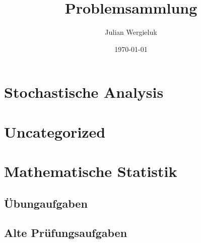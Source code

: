 \documentclass[11pt,oldfontcommands,twoside,a4paper]{memoir}
\title{Problemsammlung}\author{Julian Wergieluk}\date{\today}
\begin{document}
\frontmatter
\maketitle
\newpage
\tableofcontents

\mainmatter

\setcounter{secnumdepth}{4}
\renewcommand{\theenumi}{\Alph{enumi}.}
\renewcommand{\labelenumi}{\theenumi}





\chapter{Stochastische Analysis}






\chapter{Uncategorized}







\chapter{Mathematische Statistik}

\section{Übungaufgaben}


\section{Alte Prüfungsaufgaben}









\backmatter



\end{document}
